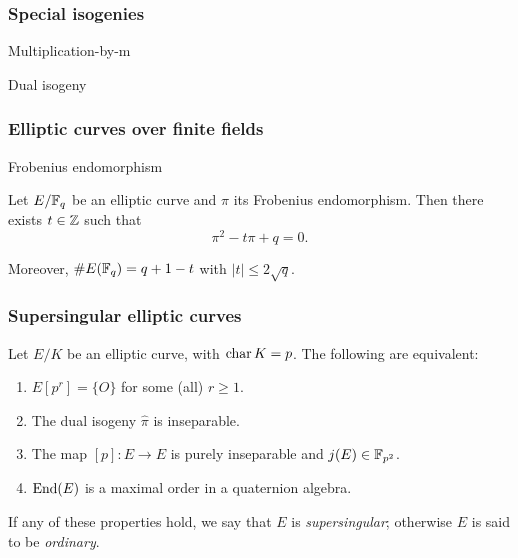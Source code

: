 \documentclass{beamer}
\begin{document}
    \begin{frame}
        \frametitle{Special isogenies}
        
        \begin{example}
            Multiplication-by-m
        \end{example}
    
        \begin{theorem}
            Dual isogeny
        \end{theorem}
    \end{frame}

    \begin{frame}
        \frametitle{Elliptic curves over finite fields}
        
        \begin{definition}
            Frobenius endomorphism
        \end{definition}
    
        \begin{theorem}
            Let $E/\mathbb{F}_q$ be an elliptic curve and $\pi$ its Frobenius endomorphism. Then there exists $t\in\mathbb{Z}$ such that $$\pi^2-t\pi+q=0.$$
            
            Moreover, $\# E(\mathbb{F}_q) = q+1-t$ with $|t|\le2\sqrt q$.
        \end{theorem}
    \end{frame}

    \begin{frame}
        \frametitle{Supersingular elliptic curves}
        
        \begin{theorem}
            Let $E/K$ be an elliptic curve, with $\operatorname{char} K=p$. The following are equivalent:
            \begin{enumerate}
                \item $E[p^r]=\{O\}$ for some (all) $r\ge1$.
                \item The dual isogeny $\hat\pi$ is inseparable.
                \item The map $[p]:E\to E$ is purely inseparable and $j(E)\in\mathbb{F}_{p^2}$.
                \item $\operatorname{End}(E)$ is a maximal order in a quaternion algebra.
            \end{enumerate}
            If any of these properties hold, we say that $E$ is \emph{supersingular}; otherwise $E$ is said to be \emph{ordinary}.
        \end{theorem}
    \end{frame}
\end{document}

